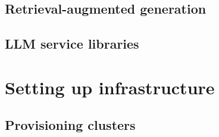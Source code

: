 \subsection{Retrieval-augmented generation}
\subsection{LLM service libraries}

\section{Setting up infrastructure}
\subsection{Provisioning clusters}
